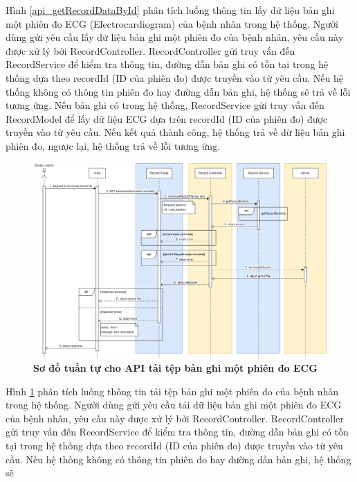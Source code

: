 Hình \ref{api_getRecordDataById} phân tích luồng thông tin lấy dữ liệu bản ghi một phiên đo ECG (Electrocardiogram) của bệnh nhân trong hệ thống. Người dùng gửi yêu cầu lấy dữ liệu bản ghi một phiên đo của bệnh nhân, 
yêu cầu này được xử lý bởi RecordController. RecordController gửi truy vấn đến RecordService để kiểm tra thông tin, đường dẫn bản ghi có tồn tại trong hệ thống dựa theo recordId (ID của phiên đo) được truyền vào từ yêu cầu. Nếu hệ thống không có thông tin phiên đo hay đường dẫn bản ghi, hệ thống sẽ
trả về lỗi tương ứng. Nếu bản ghi có trong hệ thống, RecordService gửi truy vấn đến RecordModel để lấy dữ liệu ECG dựa trên recordId (ID của phiên đo) được truyền vào từ yêu cầu. 
Nếu kết quả thành công, hệ thống trả về dữ liệu bản ghi phiên đo, ngược lại, hệ thống trả về lỗi tương ứng.

 \begin{figure}[H]
  \centering
  \includegraphics[scale=0.38]{Images/sequence_api/downloadRecordDataById.png}
  \caption[Sơ đồ tuần tự cho API tải tệp bản ghi một phiên đo ECG ]{\bfseries \fontsize{12pt}{0pt}
  \selectfont Sơ đồ tuần tự cho API tải tệp bản ghi một phiên đo ECG }
  \label{api_downloadRecordDataById} %
\end{figure}
Hình \ref{api_downloadRecordDataById} phân tích luồng thông tin tải tệp bản ghi một phiên đo của bệnh nhân trong hệ thống. Người dùng gửi yêu cầu tải dữ liệu bản ghi một phiên đo ECG của bệnh nhân, 
yêu cầu này được xử lý bởi RecordController. RecordController gửi truy vấn đến RecordService để kiểm tra thông tin, đường dẫn bản ghi có tồn tại trong hệ thống dựa theo recordId (ID của phiên đo) được truyền vào từ yêu cầu. Nếu hệ thống không có thông tin phiên đo hay đường dẫn bản ghi, hệ thống sẽ
